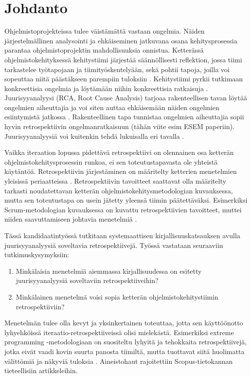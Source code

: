 
\section{Johdanto}

Ohjelmistoprojekteissa tulee väistämättä vastaan ongelmia. Näiden järjestelmällinen analysointi ja ehkäiseminen jatkuvana osana kehitysprosessia parantaa ohjelmistoprojektin mahdollisuuksia onnistua. Ketterässä ohjelmistokehityksessä kehitystiimi järjestää säännöllisesti reflektion, jossa tiimi tarkastelee työtapojaan ja tiimityöskentelyään, sekä pohtii tapoja, joilla voi sopeuttaa niitä päästäkseen parempiin tuloksiin \citep{AgileRetros2006}. Kehitystiimi pyrkii tutkimaan konkreettisia ongelmia ja löytämään niihin konkreettisia ratkaisuja \citep{AgileRetros2006}. Juurisyyanalyysi (RCA, Root Cause Analysis) tarjoaa rakenteellisen tavan löytää ongelmien aiheuttajia ja voi siten auttaa ehkäisemään näiden ongelmien esiintymistä jatkossa \citep{Lehtinen2011}. Rakenteellinen tapa tunnistaa ongelmien aiheuttajia sopii hyvin retrospektiivin ongelmanratkaisuun (tähän viite esim ESEM paperiin). Juurisyyanalyysiä voi kuitenkin tehdä lukuisalla eri tavalla \citep{Lehtinen2011}.

Vaikka iteraation lopussa pidettävä retrospektiivi on olennainen osa ketterän ohjelmistokehitysprosessin runkoa, ei sen toteutustapavasta ole yhteistä käytäntöä. Retrospektiivin järjestäminen on määritelty ketterien menetelmien yleisissä periaatteissa \citep{AgileManifestoPrinciples}. Retrospektiivin tavoitteet saattavat olla määritelty tarkasti noudatettavan ketterän ohjelmistokehitysmetodologian kuvauksessa, mutta sen toteutustapa on usein jätetty yleensä tiimin päätettäväksi. Esimerkiksi Scrum-metodologian kuvauksessa on kuvattu retrospektiivien tavoitteet, muttei niiden saavuttamiseen johtavia menetelmiä \citep{ScrumGuide2011}.

Tässä kandidaatintyössä tutkitaan systemaattisen kirjallisuuskatsauksen \citep{Kitchenham2010} avulla juurisyyanalyysiä soveltavia retrospektiivejä. Työssä vastataan seuraaviin tutkimuskysymyksiin:
\begin{enumerate}
\item Minkälaisia menetelmiä aiemmassa kirjallisuudessa on esitetty juurisyyanalyysiä soveltaviin retrospektiiveihin?
\item Minkälainen menetelmä voisi sopia ketterän ohjelmistokehitystiimin retrospektiiviin?
\end{enumerate}
Menetelmän tulee olla kevyt ja yksinkertainen toteuttaa, jotta sen käyttöönotto lyhyehköissä iteraatio-retrospektiiveissä olisi mielekästä. Esimerkiksi extreme programming -metodologiaan on suositeltu lyhyitä ja tehokkaita retrospektiivejä, jotka eivät vaadi kovin suurta panosta tiimiltä, mutta tuottavat siitä huolimatta välittömiä ja näkyviä tuloksia \citep{myllyaho2004review}. Aineistohaut rajoitettiin Scopus-tietokannan tieteellisiin artikkeleihin.

